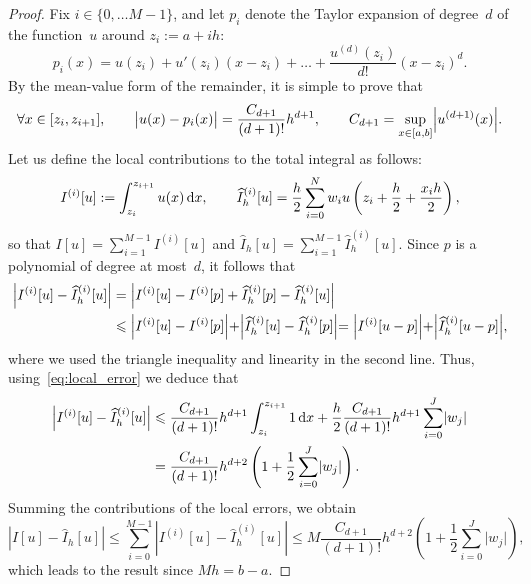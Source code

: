 \begin{proof}
    Fix $i \in \{0, \dotsc M - 1\}$,
    and let $p_i$ denote the Taylor expansion of degree~$d$ of the function~$u$ around $z_i := a + ih$:
    \begin{equation}
        \label{eq:taylor_for_integration}
        p_i(x) = u(z_i) + u'(z_i) (x - z_i) + \dotsc + \frac{u^{(d)}(z_i)}{d!} (x - z_i)^{d}.
    \end{equation}
    By the mean-value form of the remainder, 
    it is simple to prove that
    \begin{equation}
        \label{eq:local_error}
        \forall x \in [z_i, z_{i+1}], \qquad 
        \bigl\lvert u(x) - p_i(x) \bigr\rvert = \frac{C_{d+1}}{(d+1)!} h^{d+1}, \qquad C_{d+1} = \sup_{x \in [a, b]} \Bigl\lvert u^{(d+1)}(x) \Bigr\rvert.
    \end{equation}
    Let us define the local contributions to the total integral as follows:
    \[
        I^{(i)}[u] := \int_{z_i}^{z_{i+1}} u(x) \, \d x, 
        \qquad
        \widehat I_h^{(i)}[u] = \frac{h}{2} \sum_{i=0}^{N} w_i u \left( z_i + \frac{h}{2} + \frac{x_i h}{2} \right),
    \]
    so that $I[u] = \sum_{i=1}^{M - 1} I^{(i)}[u]$ and $\widehat I_h[u] = \sum_{i=1}^{M - 1} \widehat I_h^{(i)}[u]$.
    Since $p$ is a polynomial of degree at most~$d$,
    it follows that
    \begin{align*}
        \left\lvert I^{(i)}[u] - \widehat I^{(i)}_h[u] \right\rvert
        &= \Bigl\lvert I^{(i)}[u] - I^{(i)}[p] + \widehat I_h^{(i)}[p] - \widehat I_h^{(i)}[u] \Bigr\rvert \\
        &\leq 
        \Bigl\lvert I^{(i)}[u] - I^{(i)}[p] \Bigl\lvert
        + \Bigl\lvert \widehat I_h^{(i)}[u] - \widehat I_h^{(i)}[p] \Bigl\lvert
        = 
        \Bigl\lvert I^{(i)}[u - p] \Bigl\lvert
        + \Bigl\lvert \widehat I_h^{(i)}[u - p] \Bigl\lvert,
    \end{align*}
    where we used the triangle inequality and linearity in the second line.
    Thus, using~\eqref{eq:local_error} we deduce that
    \begin{align*}
        \left\lvert I^{(i)}[u] - \widehat I^{(i)}_h[u] \right\rvert
        &\leq \frac{C_{d+1}}{(d+1)!} h^{d+1} \int_{z_i}^{z_{i+1}} 1 \, \d x +  \frac{h}{2} \frac{C_{d+1}}{(d+1)!} h^{d+1} \sum_{i=0}^{J} \lvert w_j \rvert \\
        &= \frac{C_{d+1}}{(d+1)!} h^{d+2} \left(1 + \frac{1}{2} \sum_{i=0}^{J} \lvert w_j \rvert \right).
    \end{align*}
    Summing the contributions of the local errors,
    we obtain
    \[
        \left\lvert I[u] - \widehat I_h[u] \right\rvert
        \leq \sum_{i=0}^{M-1} \left\lvert I^{(i)}[u] - \widehat I_h^{(i)}[u] \right\rvert
        \leq M \frac{C_{d+1}}{(d+1)!} h^{d+2} \left(1 + \frac{1}{2} \sum_{i=0}^{J} \lvert w_j \rvert \right),
    \]
    which leads to the result since $M h = b - a$.
\end{proof}

